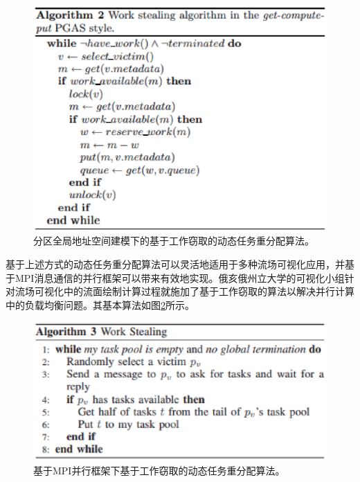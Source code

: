 \begin{figure}[!tb]
  \centering
  \includegraphics[width=0.7\linewidth,keepaspectratio]{image/loadbalance/PGAS_workstealing.eps}
  \caption{
    分区全局地址空间建模下的基于工作窃取的动态任务重分配算法\parencite{DinanLSKN09}。
 }
\label{fig:loadbalance:workstealing}
\end{figure}

基于上述方式的动态任务重分配算法可以灵活地适用于多种流场可视化应用，并基于MPI消息通信的并行框架可以带来有效地实现。俄亥俄州立大学的可视化小组针对流场可视化中的流面绘制计算过程就施加了基于工作窃取的算法以解决并行计算中的负载均衡问题\parencite{LuSP14}。其基本算法如图\ref{fig:loadbalance:workstealing_mpi}所示。

\begin{figure}[!tb]
  \centering
  \includegraphics[width=0.7\linewidth,keepaspectratio]{image/loadbalance/streamline_workstealing.eps}
  \caption{
    基于MPI并行框架下基于工作窃取的动态任务重分配算法\parencite{LuSP14}。
 }
\label{fig:loadbalance:workstealing_mpi}
\end{figure}

